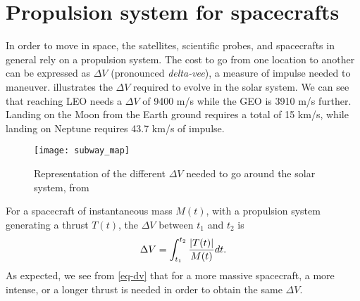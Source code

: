 


\section*{Propulsion system for spacecrafts}
\label{sec-propulsion}


In order to move in space, the satellites, scientific probes, and spacecrafts in general rely on a propulsion system.
The cost to go from one location to another can be expressed as $\Delta V$ (pronounced \emph{delta-vee}), a measure of impulse needed to maneuver.
 illustrates the $\Delta V$ required to evolve in the solar system.
We can see that reaching \ac{LEO} needs a $\Delta V$ of 9400 m/s while the \ac{GEO} is 3910 m/s further.
Landing on the Moon from the Earth ground requires a total of 15 km/s, while landing on Neptune requires 43.7 km/s of impulse.
\begin{figure}[hbtp]
  \centering
  \texttt{[image: subway\_map]}
  \caption{Representation of the different $\Delta V$ needed to go around the solar system, from \citet{reddit-subway}}
  \label{fig-subway_DV}
\end{figure}

For a spacecraft of instantaneous mass $M(t)$, with a propulsion system generating a thrust $T(t)$, the $\Delta V$ between $t_1$ and $t_2$ is
\begin{equation} \label{eq-dv}
  \Delta V = \int_{t_1}^{t_2} \frac{ \lvert T(t)\rvert}{M(t)} dt.
\end{equation}
As expected, we see from \cref{eq-dv} that for a more massive spacecraft, a more intense, or a longer thrust is needed in order to obtain the same $\Delta V$.

